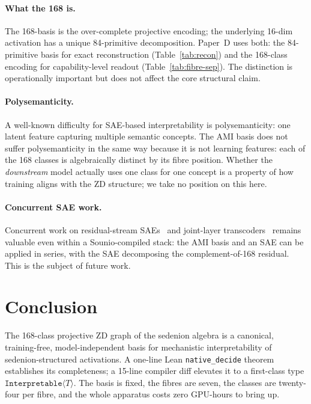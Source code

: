 \documentclass{article}
\newcommand{\Interpretable}[1]{\texttt{Interpretable}\langle #1 \rangle}
\begin{document}
\paragraph{What the 168 is.}
The 168-basis is the over-complete projective encoding; the underlying
16-dim activation has a unique 84-primitive decomposition.  Paper~D
uses both: the 84-primitive basis for exact reconstruction
(Table~\ref{tab:recon}) and the 168-class encoding for capability-level
readout (Table~\ref{tab:fibre-sep}).  The distinction is operationally
important but does not affect the core structural claim.

\paragraph{Polysemanticity.}  A well-known difficulty for SAE-based
interpretability is polysemanticity: one latent feature capturing
multiple semantic concepts.  The AMI basis does not suffer
polysemanticity in the same way because it is not learning features:
each of the 168 classes is algebraically distinct by its fibre
position.  Whether the \emph{downstream} model actually uses one
class for one concept is a property of how training aligns with the
ZD structure; we take no position on this here.

\paragraph{Concurrent SAE work.}  Concurrent work on
residual-stream SAEs~\cite{gao2024scaling} and joint-layer
transcoders~\cite{templeton2024scaling} remains valuable even within a
Sounio-compiled stack: the AMI basis and an SAE can be applied in
series, with the SAE decomposing the complement-of-168 residual.
This is the subject of future work.

\section{Conclusion}

The 168-class projective ZD graph of the sedenion algebra is a
canonical, training-free, model-independent basis for mechanistic
interpretability of sedenion-structured activations.  A one-line
Lean \texttt{native\_decide} theorem establishes its completeness; a
15-line compiler diff elevates it to a first-class type
$\Interpretable{T}$.  The basis is fixed, the fibres are seven, the
classes are twenty-four per fibre, and the whole apparatus costs zero
GPU-hours to bring up.
\end{document}
